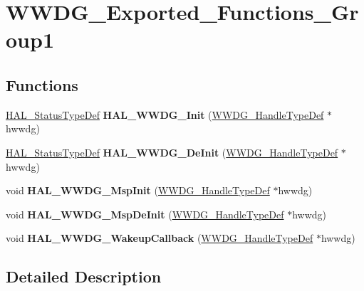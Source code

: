 \hypertarget{group___w_w_d_g___exported___functions___group1}{}\section{W\+W\+D\+G\+\_\+\+Exported\+\_\+\+Functions\+\_\+\+Group1}
\label{group___w_w_d_g___exported___functions___group1}
\subsection*{Functions}
\begin{DoxyCompactItemize}
\item 
\hyperlink{stm32f4xx__hal__def_8h_a63c0679d1cb8b8c684fbb0632743478f}{H\+A\+L\+\_\+\+Status\+Type\+Def} {\bfseries H\+A\+L\+\_\+\+W\+W\+D\+G\+\_\+\+Init} (\hyperlink{struct_w_w_d_g___handle_type_def}{W\+W\+D\+G\+\_\+\+Handle\+Type\+Def} $\ast$hwwdg)\hypertarget{group___w_w_d_g___exported___functions___group1_ga72706a378ad2f79cba4324c1b328715a}{}\label{group___w_w_d_g___exported___functions___group1_ga72706a378ad2f79cba4324c1b328715a}

\item 
\hyperlink{stm32f4xx__hal__def_8h_a63c0679d1cb8b8c684fbb0632743478f}{H\+A\+L\+\_\+\+Status\+Type\+Def} {\bfseries H\+A\+L\+\_\+\+W\+W\+D\+G\+\_\+\+De\+Init} (\hyperlink{struct_w_w_d_g___handle_type_def}{W\+W\+D\+G\+\_\+\+Handle\+Type\+Def} $\ast$hwwdg)\hypertarget{group___w_w_d_g___exported___functions___group1_gaa2a353f5e9d3d00f6cbf251770cb3259}{}\label{group___w_w_d_g___exported___functions___group1_gaa2a353f5e9d3d00f6cbf251770cb3259}

\item 
void {\bfseries H\+A\+L\+\_\+\+W\+W\+D\+G\+\_\+\+Msp\+Init} (\hyperlink{struct_w_w_d_g___handle_type_def}{W\+W\+D\+G\+\_\+\+Handle\+Type\+Def} $\ast$hwwdg)\hypertarget{group___w_w_d_g___exported___functions___group1_ga9871643c1868c37613b89d1acf010cd6}{}\label{group___w_w_d_g___exported___functions___group1_ga9871643c1868c37613b89d1acf010cd6}

\item 
void {\bfseries H\+A\+L\+\_\+\+W\+W\+D\+G\+\_\+\+Msp\+De\+Init} (\hyperlink{struct_w_w_d_g___handle_type_def}{W\+W\+D\+G\+\_\+\+Handle\+Type\+Def} $\ast$hwwdg)\hypertarget{group___w_w_d_g___exported___functions___group1_gaf7a0f80dfa5dc7832a3240a8004f113d}{}\label{group___w_w_d_g___exported___functions___group1_gaf7a0f80dfa5dc7832a3240a8004f113d}

\item 
void {\bfseries H\+A\+L\+\_\+\+W\+W\+D\+G\+\_\+\+Wakeup\+Callback} (\hyperlink{struct_w_w_d_g___handle_type_def}{W\+W\+D\+G\+\_\+\+Handle\+Type\+Def} $\ast$hwwdg)\hypertarget{group___w_w_d_g___exported___functions___group1_gac59114721456ab7cefb8bd3dffdc2c8c}{}\label{group___w_w_d_g___exported___functions___group1_gac59114721456ab7cefb8bd3dffdc2c8c}

\end{DoxyCompactItemize}


\subsection{Detailed Description}

